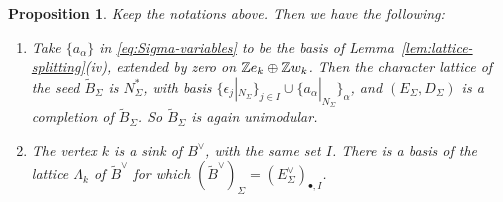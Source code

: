 \documentclass[12pt, letter]{amsart}
\newtheorem{proposition}[dummy]{Proposition}
\theoremstyle{definition}
\begin{document}
\begin{proposition}\label{prop:Sigma-completion}
Keep the notations above. Then we have the following: 
\begin{enumerate}[label=\textup{(\roman*)}]
\item Take $\{a_\alpha\}$ in \eqref{eq:Sigma-variables} to be the basis of Lemma~\ref{lem:lattice-splitting}(iv), extended by zero on $\mathbb{Z} e_k\oplus\mathbb{Z} w_k$.
Then the character lattice of the seed $\widetilde B_\Sigma$ is $N_\Sigma^*$, with basis $\{\epsilon_j|_{N_\Sigma}\}_{j\in I}\cup\{a_\alpha|_{N_\Sigma}\}_\alpha$, and $(E_\Sigma,D_\Sigma)$ is a completion of $\widetilde B_\Sigma$.
So $\widetilde B_\Sigma$ is again unimodular.
\item The vertex $k$ is a sink of $B^\vee$, with the same set $I$.
There is a basis of the lattice $\Lambda_k$ of $\widetilde B^\vee$ for which $(\widetilde B^\vee)_\Sigma=(E_\Sigma^\vee)_{\bullet,I}$.
\end{enumerate}
\end{proposition}
\end{document}
